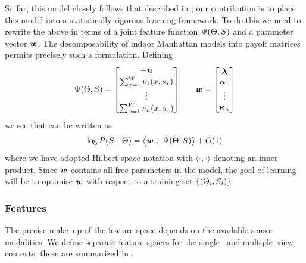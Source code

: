 So far, this model closely follows that described in \cite{Flint11};
our contribution is to place this model into a statistically rigorous
learning framework. To do this we need to rewrite the above in terms
of a joint feature function $\Psi(\Theta,S)$ and a
parameter vector $\boldsymbol{w}$. The decomposability of indoor Manhattan
models into payoff matrices permits precisely such a
formulation. Defining
\begin{align}
  \Psi(\Theta,S) =
  \begin{bmatrix}
    -\boldsymbol{n} \\
    \sum_{x=1}^W \nu_1(x,s_x) \\
    \vdots \\
    \sum_{x=1}^W \nu_n(x,s_x)
  \end{bmatrix}
  & \quad &
  \boldsymbol{w} =
  \begin{bmatrix}
    \boldsymbol{\lambda} \\
    \boldsymbol{\kappa}_1 \\
    \vdots \\
    \boldsymbol{\kappa}_n
  \end{bmatrix}
  \label{eq:joint-ftr-def}
\end{align}
we see that  can be written as
\begin{equation}
  \log P(S ~|~ \Theta)
  =
  \bigl\langle \boldsymbol{w} ~,~ \Psi(\Theta,S) \bigr\rangle +
  O(1)
  \label{eq:log-linear-posterior}
\end{equation}
where we have adopted Hilbert space notation with
$\langle\cdot,\cdot\rangle$ denoting an inner product. Since $\boldsymbol{w}$
contains all free parameters in the model, the goal of learning will
be to optimise $\boldsymbol{w}$ with respect to a training set
$\{(\Theta_i,S_i)\}$. 

\subsubsection{Features}

The precise make--up of the feature space depends on the available
sensor modalities. We define separate feature spaces for the single--
and multiple--view contexts; these are summarized in
.

